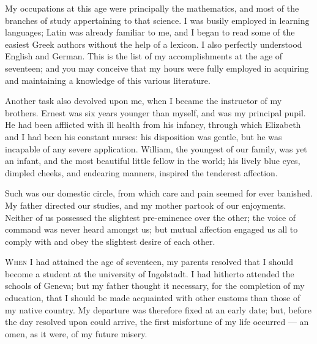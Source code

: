 My occupations at this age were
principally the mathematics, and most
of the branches of study appertaining
to that science. I was busily employed
in learning languages; Latin was already
familiar to me, and I began to
read some of the easiest Greek authors
without the help of a lexicon. I also
perfectly understood English and German.
This is the list of my accomplishments
at the age of seventeen;
and you may conceive that my hours
were fully employed in acquiring and
maintaining a knowledge of this various
literature.

Another task also devolved upon me,
when I became the instructor of my
brothers. Ernest was six years younger
than myself, and was my principal pupil.
He had been afflicted with ill
health from his infancy, through which
Elizabeth and I had been his constant
nurses: his disposition was gentle, but
he was incapable of any severe application.
William, the youngest of our
family, was yet an infant, and the most
beautiful little fellow in the world; his
lively blue eyes, dimpled cheeks, and
endearing manners, inspired the tenderest
affection.

Such was our domestic circle, from
which care and pain seemed for ever
banished. My father directed our studies,
and my mother partook of our enjoyments.
Neither of us possessed the
slightest pre-eminence over the other;
the voice of command was never heard
amongst us; but mutual affection engaged
us all to comply with and obey
the slightest desire of each other.


\textsc{When} I had attained the age of seventeen,
my parents resolved that I should
become a student at the university of
Ingolstadt. I had hitherto attended
the schools of Geneva; but my father
thought it necessary, for the completion
of my education, that I should be
made acquainted with other customs
than those of my native country. My
departure was therefore fixed at an
early date; but, before the day resolved
upon could arrive, the first misfortune
of my life occurred --- an omen, as it
were, of my future misery.

